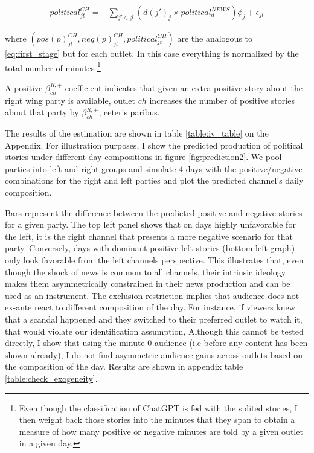 \documentclass[12pt]{article}
\begin{document}
	
	
	\begin{equation}\label{eq:pred_neg}
		\begin{aligned}
			political^{CH}_{jt}=&  \sum_{j'\in \mathcal{J} }\left(d(j')_j \times political^{NEWS} _d      \right)\phi_j +\epsilon_{jt}
		\end{aligned}
	\end{equation} 
	
	
	where $(pos(p)^{CH}_{jt},neg(p)^{CH}_{jt},political^{CH}_{jt} )$  are the analogous to \ref{eq:first_stage} but for each outlet. In this case everything is normalized by the total number of minutes \footnote{Even though the classification of ChatGPT is fed with the splited stories, I then weight back those stories into the minutes that they span to obtain a measure of how many positive or negative minutes are told by a given outlet in a given day. } 
	
	A positive $ \beta_{ch}^{R,+} $ coefficient indicates that given an extra positive story about the right wing party is available, outlet $ ch $ increases the number of positive stories about that party by $  \beta_{ch}^{R,+}  $, ceteris paribus. 
	
	
	The results of the estimation are shown in table \ref{table:iv_table} on the Appendix. For illustration purposes, I show the predicted production of political stories under different day compositions in figure \ref{fig:prediction2}. We pool parties into left and right groups and  simulate 4 days with the positive/negative combinations for the right and left parties and plot the predicted channel's daily composition. 
	
	Bars represent the difference between the predicted positive and negative  stories for a given party. The top left panel shows that on days highly unfavorable for the left, it is the right channel that presents a more negative scenario for that party. Conversely, days with dominant positive left stories (bottom left graph) only look favorable from the left channels perspective. This illustrates that, even though the shock of news is common to all channels, their intrinsic ideology makes them asymmetrically constrained in their news production and can be used as an instrument. The exclusion restriction implies that audience does not ex-ante react to different composition of the day. For instance, if viewers knew that a scandal happened and they switched to their preferred outlet to watch it, that would violate our identification assumption, Although this cannot be tested directly, I show that using the minute 0 audience (i.e before any content has been shown already), I do not find asymmetric audience gains across outlets based on the composition of the day. Results are shown in appendix table \ref{table:check_exogeneity}.
	
\end{document}
